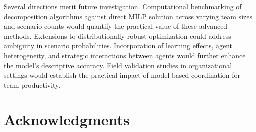 \documentclass[preprint,review,11pt]{elsarticle}
\begin{document}
Several directions merit future investigation. Computational benchmarking of decomposition algorithms against direct MILP solution across varying team sizes and scenario counts would quantify the practical value of these advanced methods. Extensions to distributionally robust optimization could address ambiguity in scenario probabilities. Incorporation of learning effects, agent heterogeneity, and strategic interactions between agents would further enhance the model's descriptive accuracy. Field validation studies in organizational settings would establish the practical impact of model-based coordination for team productivity.

\section*{Acknowledgments}




\end{document}
